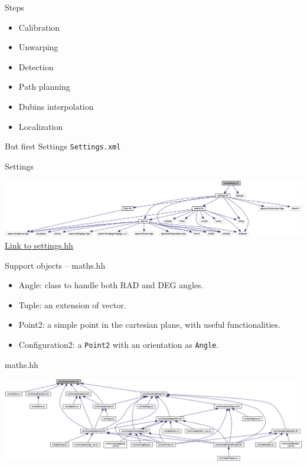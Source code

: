 \begin{frame}[t,plain]
\titlepage
\end{frame}

\begin{frame}{Steps}
	\begin{itemize}
		\item Calibration
		\item Unwarping
		\item Detection
		\item Path planning
		\item Dubins interpolation
		\item Localization
	\end{itemize}
\end{frame}

\begin{frame}[fragile]{But first Settings}	
	\texttt{Settings.xml}
\end{frame}

\begin{frame}[fragile]{Settings}	
	\begin{center}
		\includegraphics[width=\linewidth]{Immagini/settings.png}
	\vspace{1cm}
	\newline
	\href{https://icosac.github.io/LabRoboticsProject/html/class_settings.html#a4a464c938e96639861dc2deb773a2fb8}{Link to settings.hh}
	\end{center}
\end{frame}

\begin{frame}{Support objects – maths.hh}
	\begin{itemize}
		\item Angle: class to handle both RAD and DEG angles.
		\item Tuple: an extension of vector.
		\item Point2: a simple point in the cartesian plane, with useful functionalities.
		\item Configuration2: a \texttt{Point2} with an orientation as \texttt{Angle}. 
	\end{itemize}
\end{frame}
\begin{frame}[fragile]{maths.hh}
\begin{center}
	\href{https://icosac.github.io/LabRoboticsProject/html/maths_8hh.html}{\includegraphics[width=\linewidth]{Immagini/maths}}
\end{center}
\end{frame}

